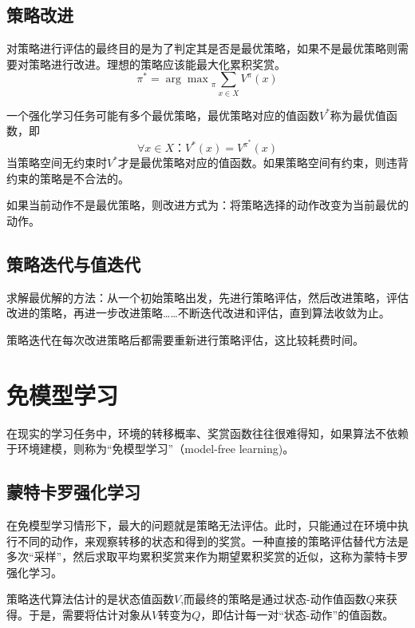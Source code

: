 \subsection{策略改进}

对策略进行评估的最终目的是为了判定其是否是最优策略，如果不是最优策略则需要对策略进行改进。理想的策略应该能最大化累积奖赏。
\begin{equation}
\pi^\ast={\arg\max}_\pi\sum_{x\in X}V^\pi(x)
\end{equation}

一个强化学习任务可能有多个最优策略，最优策略对应的值函数$V^\ast$称为最优值函数，即
\begin{equation}
\forall x\in X：V^\ast(x)=V^{\pi^\ast}(x)
\end{equation}
当策略空间无约束时$V^\ast$才是最优策略对应的值函数。如果策略空间有约束，则违背约束的策略是不合法的。

如果当前动作不是最优策略，则改进方式为：将策略选择的动作改变为当前最优的动作。

\subsection{策略迭代与值迭代}

求解最优解的方法：从一个初始策略出发，先进行策略评估，然后改进策略，评估改进的策略，再进一步改进策略……不断迭代改进和评估，直到算法收敛为止。

策略迭代在每次改进策略后都需要重新进行策略评估，这比较耗费时间。

\section{免模型学习}

在现实的学习任务中，环境的转移概率、奖赏函数往往很难得知，如果算法不依赖于环境建模，则称为“免模型学习”（model-free learning)。

\subsection{蒙特卡罗强化学习}

在免模型学习情形下，最大的问题就是策略无法评估。此时，只能通过在环境中执行不同的动作，来观察转移的状态和得到的奖赏。一种直接的策略评估替代方法是多次“采样”，然后求取平均累积奖赏来作为期望累积奖赏的近似，这称为蒙特卡罗强化学习。

策略迭代算法估计的是状态值函数$V$,而最终的策略是通过状态-动作值函数$Q$来获得。于是，需要将估计对象从$V$转变为$Q$，即估计每一对“状态-动作”的值函数。

